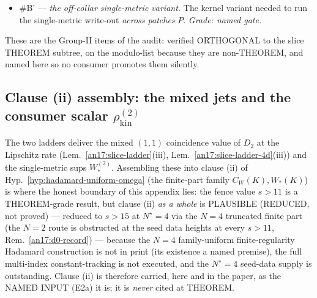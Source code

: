 \begin{remark}
\begin{itemize}[leftmargin=*,nosep]
{  (the source-rung survival sweep of Rem.~\ref{an17:d0-record}(v) now
  discharged --- the source columns re-derived, the source demand priced
  honestly as the profiled $\partial^2$-package output that drops in lockstep
  with the supply, so the source rung over-delivers for all $s$ and imposes no
  upper fence; (D0) is SUPPLIABLE for $s>15$ --- THEOREM at the seed,
  end-to-end PLAUSIBLE via the standing $B3$/(E-env) interface). The (D0) port's closure display
  (App.~\ref{app:e2a-ports}) is gated accordingly; its lever and $w_0$
  lemmas stand.}
\item \#B' --- \emph{the off-collar single-metric variant.} The kernel variant
  needed to run the single-metric write-out \emph{across patches} $P$.
  \emph{Grade: named gate.}
\end{itemize}
These are the Group-II items of the audit: verified ORTHOGONAL to the slice
THEOREM subtree, on the modulo-list because they are non-THEOREM, and named here
so no consumer promotes them silently.
\end{remark}

\subsection{Clause (ii) assembly: the mixed jets and the consumer scalar
\texorpdfstring{$\rho^{(2)}_{\mathrm{kin}}$}{rho2-kin}}\label{an17:sec-clauseii}\label{sec:an17-clause-ii}%

The two ladders deliver the mixed $(1,1)$ coincidence value of $D_2$ at the
Lipschitz rate (Lem.~\ref{an17:slice-ladder}(iii),
Lem.~\ref{an17:slice-ladder-4d}(iii)) and the single-metric sups $W^{(2)}_*$.
Assembling these into clause (ii) of Hyp.~\ref{hyp:hadamard-uniform-omega}
(the finite-part family $C_W(K),W_*(K)$) is where the honest boundary of this
appendix lies: the fence value $s>11$ is a THEOREM-grade result, but clause (ii)
\emph{as a whole} is PLAUSIBLE (REDUCED, not proved) --- reduced to $s>15$ at
$N^\star{=}4$ via the $N=4$ truncated finite part (the $N=2$ route is obstructed
at the seed data heights at every $s>11$, Rem.~\ref{an17:d0-record}) --- because
the $N=4$ family-uniform finite-regularity Hadamard construction is not in print
(its existence a named premise), the full multi-index constant-tracking is not
executed, and the $N^\star{=}4$ seed-data supply is outstanding. Clause (ii) is therefore carried, here and in
the paper, as the NAMED INPUT (E2a) it is; it is \emph{never} cited at THEOREM.

